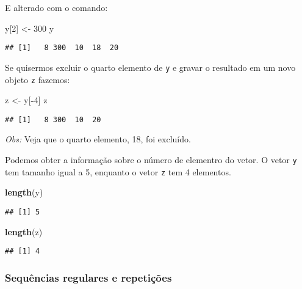 \documentclass[
]{book}
\newenvironment{Shaded}{\begin{snugshade}}{\end{snugshade}}
\newcommand{\DecValTok}[1]{\textcolor[rgb]{0.00,0.00,0.81}{#1}}
\newcommand{\KeywordTok}[1]{\textcolor[rgb]{0.13,0.29,0.53}{\textbf{#1}}}
\newcommand{\NormalTok}[1]{#1}
\newcommand{\OperatorTok}[1]{\textcolor[rgb]{0.81,0.36,0.00}{\textbf{#1}}}
\newcommand{\StringTok}[1]{\textcolor[rgb]{0.31,0.60,0.02}{#1}}
\begin{document}
E alterado com o comando:

\begin{Shaded}
\begin{Highlighting}[]
\NormalTok{y[}\DecValTok{2}\NormalTok{] <-}\StringTok{ }\DecValTok{300}
\NormalTok{y}
\end{Highlighting}
\end{Shaded}

\begin{verbatim}
## [1]   8 300  10  18  20
\end{verbatim}

Se quisermos excluir o quarto elemento de \texttt{y} e gravar o resultado em um novo objeto \texttt{z} fazemos:

\begin{Shaded}
\begin{Highlighting}[]
\NormalTok{z <-}\StringTok{ }\NormalTok{y[}\OperatorTok{-}\DecValTok{4}\NormalTok{]}
\NormalTok{z}
\end{Highlighting}
\end{Shaded}

\begin{verbatim}
## [1]   8 300  10  20
\end{verbatim}

\emph{Obs:} Veja que o quarto elemento, 18, foi excluído.

Podemos obter a informação sobre o número de elementro do vetor. O vetor \texttt{y} tem tamanho igual a 5, enquanto o vetor \texttt{z} tem 4 elementos.

\begin{Shaded}
\begin{Highlighting}[]
\KeywordTok{length}\NormalTok{(y)}
\end{Highlighting}
\end{Shaded}

\begin{verbatim}
## [1] 5
\end{verbatim}

\begin{Shaded}
\begin{Highlighting}[]
\KeywordTok{length}\NormalTok{(z)}
\end{Highlighting}
\end{Shaded}

\begin{verbatim}
## [1] 4
\end{verbatim}

\hypertarget{sequuxeancias-regulares-e-repetiuxe7uxf5es}{%
\subsubsection{Sequências regulares e repetições}\label{sequuxeancias-regulares-e-repetiuxe7uxf5es}}
\end{document}
